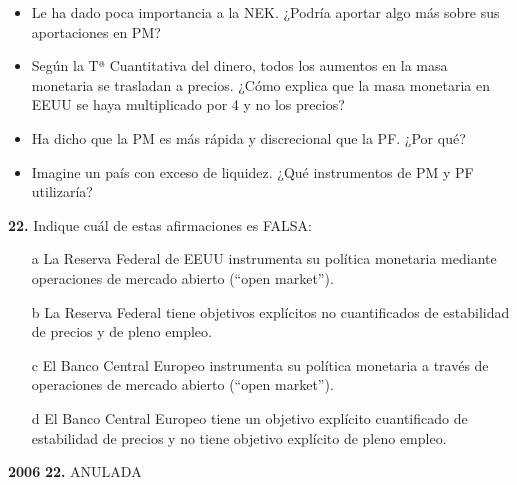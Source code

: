 \documentclass{nuevotema}
\begin{document}
\begin{itemize}
    \item Le ha dado poca importancia a la NEK. ¿Podría aportar algo más sobre sus aportaciones en PM?
    \item Según la Tª Cuantitativa del dinero, todos los aumentos en la masa monetaria se trasladan a precios. ¿Cómo explica que la masa monetaria en EEUU se haya multiplicado por 4 y no los precios?
    \item Ha dicho que la PM es más rápida y discrecional que la PF. ¿Por qué?
    \item Imagine un país con exceso de liquidez. ¿Qué instrumentos de PM y PF utilizaría?
\end{itemize}


\textbf{22.} Indique cuál de estas afirmaciones es FALSA:

\begin{itemize}
	\item[a] La Reserva Federal de EEUU instrumenta su política monetaria mediante operaciones de mercado abierto (``open market'').
	\item[b] La Reserva Federal tiene objetivos explícitos no cuantificados de estabilidad de precios y de pleno empleo.
	\item[c] El Banco Central Europeo instrumenta su política monetaria a través de operaciones de mercado abierto (``open market'').
	\item[d] El Banco Central Europeo tiene un objetivo explícito cuantificado de estabilidad de precios y no tiene objetivo explícito de pleno empleo.
\end{itemize}


\notas

\textbf{2006} \textbf{22.} ANULADA

\bibliografia
\end{document}
